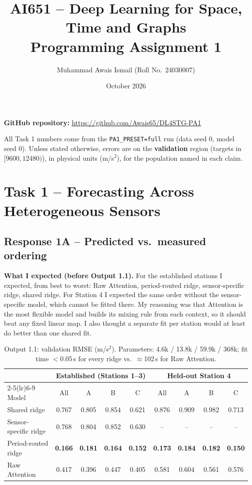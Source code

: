 \documentclass[11pt]{article}
\title{AI651 -- Deep Learning for Space, Time and Graphs\\Programming Assignment 1}
\author{Muhammad Awais Ismail \quad (Roll No.\ 24030007)}
\date{October 2026}
\begin{document}
\maketitle
\noindent\textbf{GitHub repository:} \url{https://github.com/Awais65/DL4STG-PA1}

\noindent All Task 1 numbers come from the \texttt{PA1\_PRESET=full} run (data seed 0, model seed 0).
Unless stated otherwise, errors are on the \textbf{validation} region (targets in $[9600,12480)$),
in physical units (m/s$^2$), for the population named in each claim.

\section*{Task 1 -- Forecasting Across Heterogeneous Sensors}

\subsection*{Response 1A -- Predicted vs.\ measured ordering}

\textbf{What I expected (before Output 1.1).} For the established stations I expected, from best
to worst: Raw Attention, period-routed ridge, sensor-specific ridge, shared ridge. For Station 4 I
expected the same order without the sensor-specific model, which cannot be fitted there. My
reasoning was that Attention is the most flexible model and builds its mixing rule from each
context, so it should beat any fixed linear map. I also thought a separate fit per station would
at least do better than one shared fit.

\begin{table}[h]\centering\small
\begin{tabular}{lcccccccc}\toprule
 & \multicolumn{4}{c}{Established (Stations 1--3)} & \multicolumn{4}{c}{Held-out Station 4}\\
\cmidrule(lr){2-5}\cmidrule(lr){6-9}
Model & All & A & B & C & All & A & B & C\\\midrule
Shared ridge          & 0.767 & 0.805 & 0.854 & 0.621 & 0.876 & 0.909 & 0.982 & 0.713\\
Sensor-specific ridge & 0.768 & 0.804 & 0.852 & 0.630 & -- & -- & -- & --\\
Period-routed ridge   & \textbf{0.166} & \textbf{0.181} & \textbf{0.164} & \textbf{0.152} & \textbf{0.173} & \textbf{0.184} & \textbf{0.182} & \textbf{0.150}\\
Raw Attention         & 0.417 & 0.396 & 0.447 & 0.405 & 0.581 & 0.604 & 0.561 & 0.576\\\bottomrule
\end{tabular}
\caption{Output 1.1: validation RMSE (m/s$^2$). Parameters: 4.6k / 13.8k / 59.9k / 368k; fit time
$<$0.05\,s for every ridge vs.\ $\approx$102\,s for Raw Attention.}
\end{table}
\end{document}
